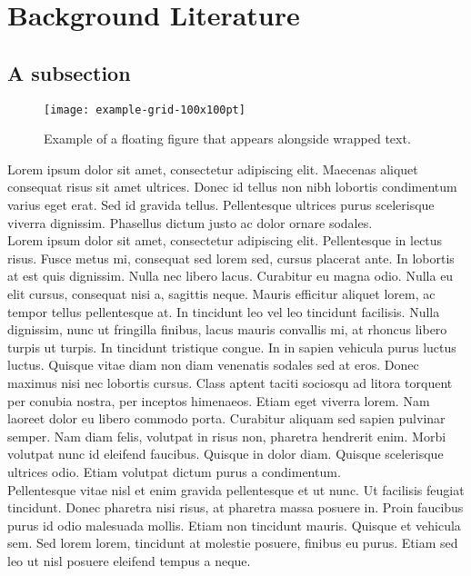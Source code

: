 \section{Background Literature}

\lipsum[4]

\subsection{A subsection} 

\begin{wrapfigure}[21]{R}{0.55\textwidth}
    \centering
    \texttt{[image: example-grid-100x100pt]}
    \caption{\label{fig:ann-basic} Example of a floating figure that appears alongside wrapped text.}
\end{wrapfigure}

Lorem ipsum dolor sit amet, consectetur adipiscing elit. Maecenas aliquet consequat risus sit amet ultrices. Donec id tellus non nibh lobortis condimentum varius eget erat. Sed id gravida tellus. Pellentesque ultrices purus scelerisque viverra dignissim. Phasellus dictum justo ac dolor ornare sodales. \\

Lorem ipsum dolor sit amet, consectetur adipiscing elit. Pellentesque in lectus risus. Fusce metus mi, consequat sed lorem sed, cursus placerat ante. In lobortis at est quis dignissim. Nulla nec libero lacus. Curabitur eu magna odio. Nulla eu elit cursus, consequat nisi a, sagittis neque. Mauris efficitur aliquet lorem, ac tempor tellus pellentesque at. In tincidunt leo vel leo tincidunt facilisis. Nulla dignissim, nunc ut fringilla finibus, lacus mauris convallis mi, at rhoncus libero turpis ut turpis. In tincidunt tristique congue. In in sapien vehicula purus luctus luctus. Quisque vitae diam non diam venenatis sodales sed at eros. Donec maximus nisi nec lobortis cursus. Class aptent taciti sociosqu ad litora torquent per conubia nostra, per inceptos himenaeos. Etiam eget viverra lorem. Nam laoreet dolor eu libero commodo porta. Curabitur aliquam sed sapien pulvinar semper. Nam diam felis, volutpat in risus non, pharetra hendrerit enim. Morbi volutpat nunc id eleifend faucibus. Quisque in dolor diam. Quisque scelerisque ultrices odio. Etiam volutpat dictum purus a condimentum. \\

Pellentesque vitae nisl et enim gravida pellentesque et ut nunc. Ut facilisis feugiat tincidunt. Donec pharetra nisi risus, at pharetra massa posuere in. Proin faucibus purus id odio malesuada mollis. Etiam non tincidunt mauris. Quisque et vehicula sem. Sed lorem lorem, tincidunt at molestie posuere, finibus eu purus. Etiam sed leo ut nisl posuere eleifend tempus a neque.

